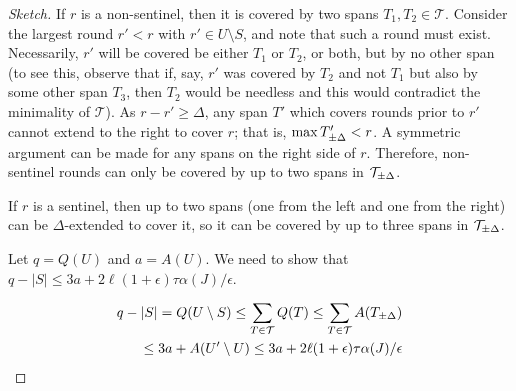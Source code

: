 \begin{proof}[Sketch]
  If $r$ is a non-sentinel, then it is covered by two spans
  $T_1, T_2 \in \mathcal{T}$. Consider the
  largest round $r' < r$ with $r' \in U \setminus S$, and note that such a round
  must exist. Necessarily, $r'$ will be covered be either $T_1$ or $T_2$, or
  both, but by no other span (to see this, observe that if, say, $r'$ was covered
  by $T_2$ and not $T_1$ but also by some other span $T_3$, then $T_2$ would be
  needless and this would contradict the minimality of $\mathcal{T}$). As $r -
  r' \geq \Delta$, any span $T'$ which covers rounds prior to $r'$ cannot extend
  to the right to cover $r$; that is, $\max{T'_{\pm\Delta}} < r$. A symmetric
  argument can be made for any spans on the right side of $r$. Therefore,
  non-sentinel rounds can only be covered by up to two spans in
  $\mathcal{T}_{\pm\Delta}$.



  If $r$ is a sentinel, then up to two spans (one from the left and one from the
  right) can be $\Delta$-extended to cover it, so it can be covered by up to
  three spans in $\mathcal{T}_{\pm\Delta}$.

  Let $q = Q(U)$ and $a = A(U)$.
  We need to show that
  $q - |S| \leq 3a + 2\ell (1 + \epsilon) \tau \alpha(J) / \epsilon$.

  \begin{align*}
  q - |S| = Q(U \setminus S) \leq \sum_{T \in \mathcal{T}} Q(T)
  \leq \sum_{T\in\mathcal{T}} A(T_{\pm\Delta})\\
  \leq 3a + A(U' \setminus U) \leq 3a + 2\ell(1 + \epsilon) \tau \alpha(J) / \epsilon
  \end{align*}
\end{proof}

